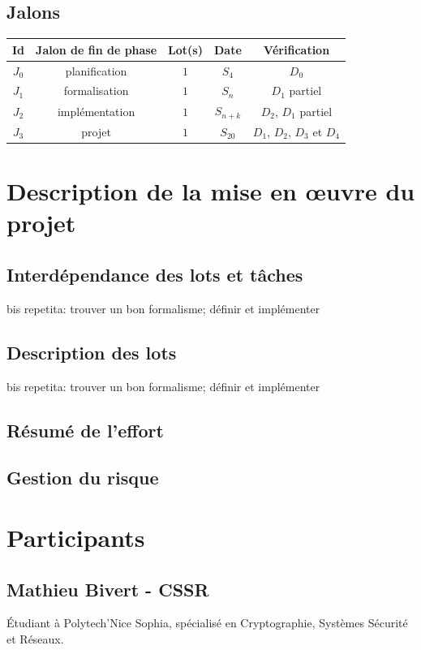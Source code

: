 \documentclass[a4paper]{article}
\begin{document}
\subsection{Jalons}
\begin{center}
\begin{tabular}{c|c|c|c|c}
	Id & Jalon de fin de phase & Lot(s) & Date & Vérification \\
	\hline
	\hline
	$J_0$ & planification & $1$ & $S_4$ & $D_0$ \\
	\hline
	$J_1$ & formalisation & $1$ & $S_n$ & $D_1$ partiel \\
	\hline
	$J_2$ & implémentation & $1$ & $S_{n+k}$ & $D_2$, $D_1$ partiel \\
	\hline
	$J_3$ & projet & $1$ & $S_{20}$ & $D_1$, $D_2$, $D_3$ et $D_4$ \\
\end{tabular}
\end{center}

\section{Description de la mise en œuvre du projet}
\subsection{Interdépendance des lots et tâches}
bis repetita: trouver un bon formalisme; définir et implémenter
\subsection{Description des lots}
bis repetita: trouver un bon formalisme; définir et implémenter
\subsection{Résumé de l'effort}
\subsection{Gestion du risque}

\section{Participants}
\subsection{Mathieu Bivert - CSSR}
Étudiant à Polytech'Nice Sophia, spécialisé en Cryptographie, Systèmes
Sécurité et Réseaux.
\end{document}

